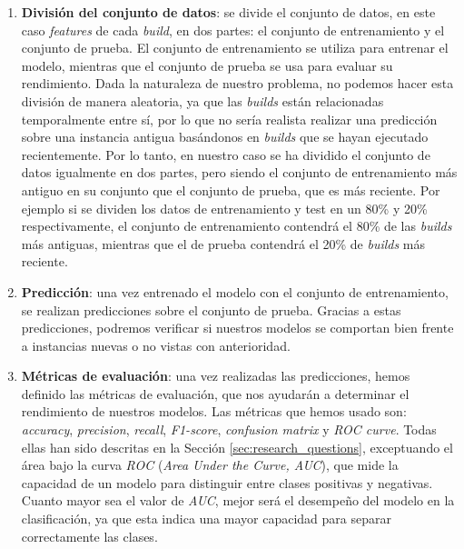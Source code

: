 \begin{enumerate}
    \item \textbf{División del conjunto de datos}: se divide el conjunto de datos, en este caso
    \textit{features} de cada \textit{build}, en dos partes: el conjunto de entrenamiento y el
    conjunto de prueba. El conjunto de entrenamiento se utiliza para entrenar el modelo, mientras
    que el conjunto de prueba se usa para evaluar su rendimiento. Dada la naturaleza de nuestro
    problema, no podemos hacer esta división de manera aleatoria, ya que las \textit{builds} están
    relacionadas temporalmente entre sí, por lo que no sería realista realizar una predicción
    sobre una instancia antigua basándonos en \textit{builds} que se hayan ejecutado recientemente.
    Por lo tanto, en nuestro caso se ha dividido el conjunto de datos igualmente en dos partes,
    pero siendo el conjunto de entrenamiento más antiguo en su conjunto que el conjunto de prueba,
    que es más reciente. Por ejemplo si se dividen los datos de entrenamiento y test en un 80\% y
    20\% respectivamente, el conjunto de entrenamiento contendrá el 80\% de las \textit{builds}
    más antiguas, mientras que el de prueba contendrá el 20\% de \textit{builds} más reciente.\\
    \item \textbf{Predicción}: una vez entrenado el modelo con el conjunto de entrenamiento, se
    realizan predicciones sobre el conjunto de prueba. Gracias a estas predicciones, podremos
    verificar si nuestros modelos se comportan bien frente a instancias nuevas o no vistas con
    anterioridad.\\
    \item \textbf{Métricas de evaluación}: una vez realizadas las predicciones, hemos definido
    las métricas de evaluación, que nos ayudarán a determinar el rendimiento de nuestros modelos.
    Las métricas que hemos usado son: \textit{accuracy}, \textit{precision}, \textit{recall},
    \textit{F1-score}, \textit{confusion matrix} y \textit{ROC curve}. Todas
    ellas han sido descritas en la Sección \ref{sec:research_questions}, exceptuando el área
    bajo la curva \textit{ROC} (\textit{Area Under the Curve, AUC}), que mide la capacidad de
    un modelo para distinguir entre clases positivas y negativas. Cuanto mayor sea el valor de
    \textit{AUC}, mejor será el desempeño del modelo en la clasificación, ya que esta indica una
    mayor capacidad para separar correctamente las clases.
\end{enumerate}


